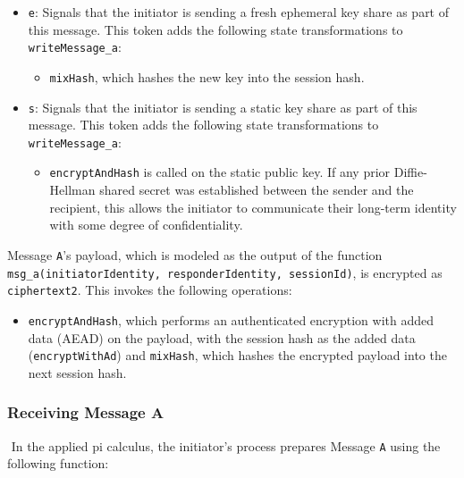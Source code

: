 \begin{itemize}

\item \texttt{e}: Signals that the initiator is sending a fresh ephemeral key share as part of this message. This token adds the following state transformations to \texttt{writeMessage\_a}:
\begin{itemize}

\item \texttt{mixHash}, which hashes the new key into the session hash.
\end{itemize}


\item \texttt{s}: Signals that the initiator is sending a static key share as part of this message. This token adds the following state transformations to \texttt{writeMessage\_a}:
\begin{itemize}

\item \texttt{encryptAndHash} is called on the static public key. If any prior Diffie-Hellman shared secret was established between the sender and the recipient, this allows the initiator to communicate their long-term identity with some degree of confidentiality.
\end{itemize}


\end{itemize}
Message \texttt{A}'s payload, which is modeled as the output of the function \texttt{msg\_a(initiatorIdentity, responderIdentity, sessionId)}, is encrypted as \texttt{ciphertext2}. This invokes the following operations:


\begin{itemize}

\item \texttt{encryptAndHash}, which performs an authenticated encryption with added data (AEAD) on the payload, with the session hash as the added data (\texttt{encryptWithAd}) and \texttt{mixHash}, which hashes the encrypted payload into the next session hash.

\end{itemize}
\subsubsection{Receiving Message A}$ $
In the applied pi calculus, the initiator's process prepares Message \texttt{A} using the following function:


